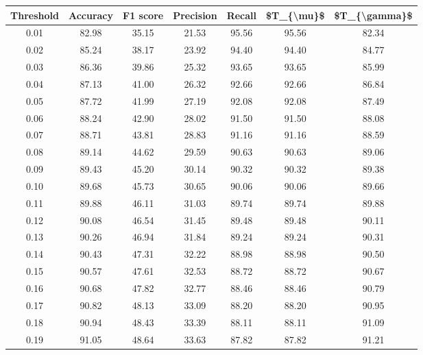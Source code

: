 \begin{tabular}{|c|c|c|c|c|c|c|}
\hline
 Threshold &  Accuracy &  F1 score &  Precision &  Recall &  \$T\_\{\textbackslash mu\}\$ &  \$T\_\{\textbackslash gamma\}\$ \\
\hline
      0.01 &     82.98 &     35.15 &      21.53 &   95.56 &      95.56 &         82.34 \\
      0.02 &     85.24 &     38.17 &      23.92 &   94.40 &      94.40 &         84.77 \\
      0.03 &     86.36 &     39.86 &      25.32 &   93.65 &      93.65 &         85.99 \\
      0.04 &     87.13 &     41.00 &      26.32 &   92.66 &      92.66 &         86.84 \\
      0.05 &     87.72 &     41.99 &      27.19 &   92.08 &      92.08 &         87.49 \\
      0.06 &     88.24 &     42.90 &      28.02 &   91.50 &      91.50 &         88.08 \\
      0.07 &     88.71 &     43.81 &      28.83 &   91.16 &      91.16 &         88.59 \\
      0.08 &     89.14 &     44.62 &      29.59 &   90.63 &      90.63 &         89.06 \\
      0.09 &     89.43 &     45.20 &      30.14 &   90.32 &      90.32 &         89.38 \\
      0.10 &     89.68 &     45.73 &      30.65 &   90.06 &      90.06 &         89.66 \\
      0.11 &     89.88 &     46.11 &      31.03 &   89.74 &      89.74 &         89.88 \\
      0.12 &     90.08 &     46.54 &      31.45 &   89.48 &      89.48 &         90.11 \\
      0.13 &     90.26 &     46.94 &      31.84 &   89.24 &      89.24 &         90.31 \\
      0.14 &     90.43 &     47.31 &      32.22 &   88.98 &      88.98 &         90.50 \\
      0.15 &     90.57 &     47.61 &      32.53 &   88.72 &      88.72 &         90.67 \\
      0.16 &     90.68 &     47.82 &      32.77 &   88.46 &      88.46 &         90.79 \\
      0.17 &     90.82 &     48.13 &      33.09 &   88.20 &      88.20 &         90.95 \\
      0.18 &     90.94 &     48.43 &      33.39 &   88.11 &      88.11 &         91.09 \\
      0.19 &     91.05 &     48.64 &      33.63 &   87.82 &      87.82 &         91.21 \\

\end{tabular}
